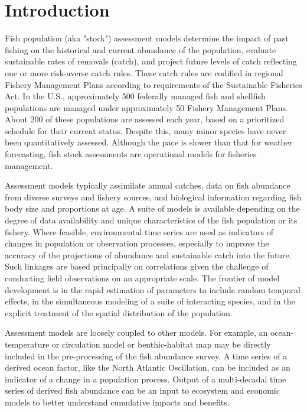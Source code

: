 
\section[Introduction]{Introduction \protect\hyperref[sec:intro]{\faExternalLink}}\label{sec:intro}

Fish population (aka "stock") assessment models determine the impact of past fishing on the historical and current abundance of the population, evaluate sustainable rates of removals (catch), and project future levels of catch reflecting one or more risk-averse catch rules. These catch rules are codified in regional Fishery Management Plans according to requirements of the Sustainable Fisheries Act. In the U.S., approximately 500 federally managed fish and shellfish populations are managed under approximately 50 Fishery Management Plans.  About 200 of these populations are assessed each year, based on a prioritized schedule for their current status. Despite this, many minor species have never been quantitatively assessed. Although the pace is slower than that for weather forecasting, fish stock assessments are operational models for fisheries management.

Assessment models typically assimilate annual catches, data on fish abundance from diverse surveys and fishery sources, and biological information regarding fish body size and proportions at age. A suite of models is available depending on the degree of data availability and unique characteristics of the fish population or its fishery. Where feasible, environmental time series are used as indicators of changes in population or observation processes, especially to improve the accuracy of the projections of abundance and sustainable catch into the future. Such linkages are based principally on correlations given the challenge of conducting field observations on an appropriate scale. The frontier of model development is in the rapid estimation of parameters to include random temporal effects, in the simultaneous modeling of a suite of interacting species, and in the explicit treatment of the spatial distribution of the population.

Assessment models are loosely coupled to other models. For example, an ocean-temperature or circulation model or benthic-habitat map may be directly included in the pre-processing of the fish abundance survey. A time series of a derived ocean factor, like the North Atlantic Oscillation, can be included as an indicator of a change in a population process. Output of a multi-decadal time series of derived fish abundance can be an input to ecosystem and economic models to better understand cumulative impacts and benefits. 

